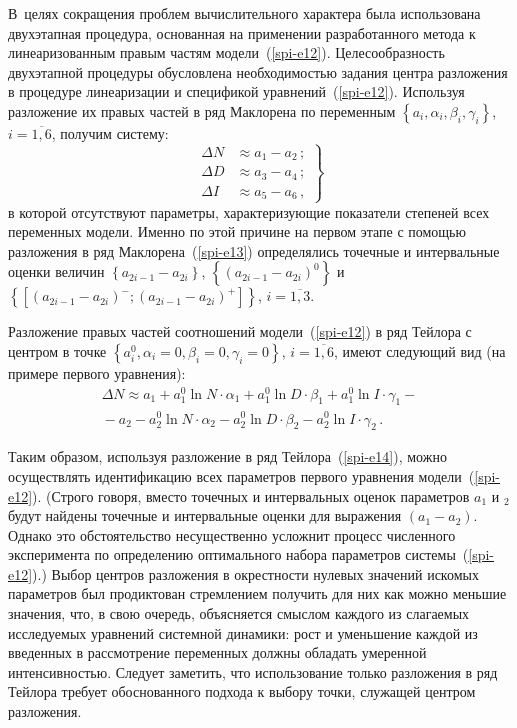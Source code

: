 {\begin{multicols}{2}
  В~целях сокращения проблем вычислительного характера была использована
двухэтапная процедура, основанная на применении разработанного метода к
линеаризованным правым частям модели~(\ref{spi-e12}). Целесообразность
двухэтапной процедуры обусловлена необходимостью задания центра
разложения в процедуре линеаризации и спецификой уравнений~(\ref{spi-e12}).
Используя разложение их правых частей в ряд Маклорена по переменным
$\left\{ a_i, \alpha_i, \beta_i, \gamma_i\right\}$, $i = \overline{1, 6}$, получим
систему:
\begin{equation}
\left.
\begin{array}{rl}
\Delta N & \approx a_1 - a_2\,;\\[9pt]
\Delta D & \approx a_3 - a_4\,;\\[9pt]
\Delta I & \approx a_5 - a_6\,,
\end{array}
\right\}
\label{spi-e13}
\end{equation}
в которой отсутствуют параметры, характери\-зу\-ющие показатели степеней всех
переменных модели. Именно по этой причине на первом этапе с помощью
разложения в ряд Маклорена~(\ref{spi-e13}) определялись точечные и
интервальные оценки величин $ \left\{ a_{2i -1} - a_{2i} \right\} $,
$ \left\{\left(  a_{2i -1} - a_{2i}\right)^0 \right\}$ и
$ \left\{\left[\left( a_{2i -1} - a_{2i}\right)^- ; \left( a_{2i -1} - a_{2i}\right)^+ \right]
\right\}$, $i= \overline{1, 3}$.

Разложение правых частей соотношений модели~(\ref{spi-e12}) в ряд Тейлора с
центром в точке $\left\{ a_i^0, \alpha_i= 0, \beta_i =0, \gamma_i = 0 \right\}$, $i =
\overline{1, 6}$, имеют следующий вид (на примере первого уравнения):
\begin{multline}
\Delta N \approx a_1 + a_1^0  \ln N\cdot \alpha_1 +
 a_1^0  \ln D\cdot \beta_1 +
 a_1^0  \ln I\cdot \gamma_1 -{}\\
{}- a_2 - a_2^0  \ln N\cdot \alpha_2 -
 a_2^0  \ln D\cdot \beta_2 -
 a_2^0  \ln I\cdot \gamma_2\,.
\label{spi-e14}
\end{multline}

  Таким образом, используя разложение в ряд Тейлора~(\ref{spi-e14}), можно
осуществлять идентификацию всех параметров первого уравнения
модели~(\ref{spi-e12}). (Строго говоря, вместо точечных и интервальных
оценок параметров $a_1$ и $_2$ будут найдены точечные и интервальные
оценки для выражения $\left( a_1 - a_2\right)$. Однако это обстоятельство
несущественно усложнит процесс численного эксперимента по определению
оптимального набора параметров системы~(\ref{spi-e12}).) Выбор центров
разложения в окрестности нулевых значений искомых параметров был
продиктован стремлением получить для них как можно меньшие значения, что,
в свою очередь, объясняется смыс\-лом каждого из слагаемых исследуемых
уравнений системной динамики: рост и уменьшение каждой из введенных в
рассмотрение переменных должны обладать умеренной интенсивностью.
Следует заметить, что использование только разложения в ряд Тейлора требует
обоснованного подхода к выбору точки, служащей центром разложения.


\end{multicols}}
